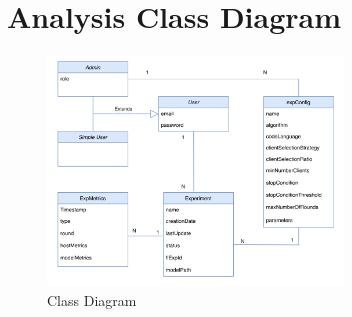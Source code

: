 
\newpage
\section{Analysis Class Diagram}

\begin{figure}[ht!]
    \centering
    \includegraphics[width=0.7\textwidth]{images/2_analisys/FL_class_diag.png}
    \caption{Class Diagram}
    \label{fig:class_diagram}
\end{figure}

